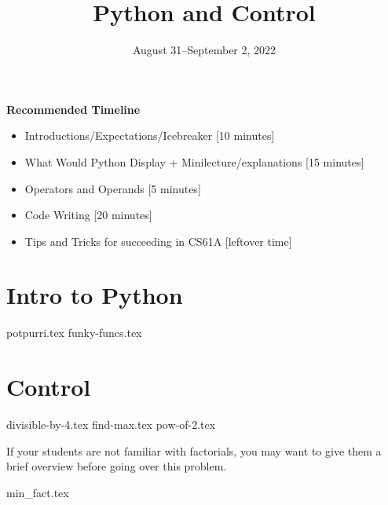 \documentclass{exam}
\title{Python and Control}
\date{August 31--September 2, 2022}
\begin{document}
\maketitle
\begin{guide}
\textbf{Recommended Timeline}
\begin{itemize}
  \item Introductions/Expectations/Icebreaker [10 minutes]
  \item What Would Python Display + Minilecture/explanations [15 minutes]
  \item Operators and Operands [5 minutes]
  \item Code Writing [20 minutes]
  \item Tips and Tricks for succeeding in CS61A [leftover time]
\end{itemize}
\end{guide}


\section{Intro to Python}
\begin{questions}
{potpurri.tex}
{funky-funcs.tex}
\end{questions}

\section{Control}
\begin{questions}
{divisible-by-4.tex}
{find-max.tex}
{pow-of-2.tex}
\begin{guide}
  If your students are not familiar with factorials, you may want to give them a brief overview before going over this problem. 
\end{guide}
{min_fact.tex}
\end{questions}
\end{document}
